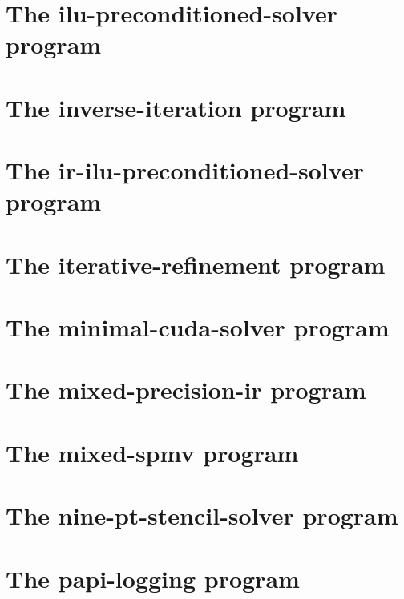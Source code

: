 \let\mypdfximage\pdfximage\def\pdfximage{\immediate\mypdfximage}\documentclass[twoside]{book}
\newcommand{\+}{\discretionary{\mbox{\scriptsize$\hookleftarrow$}}{}{}}
\begin{document}
\chapter{The ilu-\/preconditioned-\/solver program}
\label{ilu_preconditioned_solver}

\chapter{The inverse-\/iteration program}
\label{inverse_iteration}

\chapter{The ir-\/ilu-\/preconditioned-\/solver program}
\label{ir_ilu_preconditioned_solver}

\chapter{The iterative-\/refinement program}
\label{iterative_refinement}

\chapter{The minimal-\/cuda-\/solver program}
\label{minimal_cuda_solver}

\chapter{The mixed-\/precision-\/ir program}
\label{mixed_precision_ir}

\chapter{The mixed-\/spmv program}
\label{mixed_spmv}

\chapter{The nine-\/pt-\/stencil-\/solver program}
\label{nine_pt_stencil_solver}

\chapter{The papi-\/logging program}
\label{papi_logging}

\end{document}

